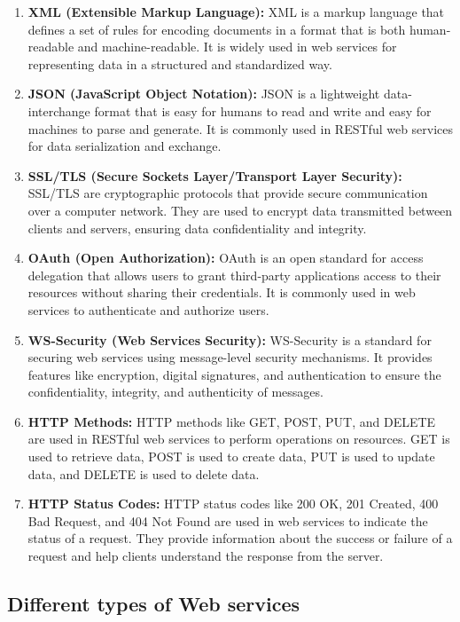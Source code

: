 \documentclass[11pt]{article}
\begin{document}
\begin{enumerate}
    \item \textbf{XML (Extensible Markup Language):} XML is a markup language that defines a set of rules for encoding documents in a format that is both human-readable and machine-readable. It is widely used in web services for representing data in a structured and standardized way.
    \item \textbf{JSON (JavaScript Object Notation):} JSON is a lightweight data-interchange format that is easy for humans to read and write and easy for machines to parse and generate. It is commonly used in RESTful web services for data serialization and exchange.
    \item \textbf{SSL/TLS (Secure Sockets Layer/Transport Layer Security):} SSL/TLS are cryptographic protocols that provide secure communication over a computer network. They are used to encrypt data transmitted between clients and servers, ensuring data confidentiality and integrity.
    \item \textbf{OAuth (Open Authorization):} OAuth is an open standard for access delegation that allows users to grant third-party applications access to their resources without sharing their credentials. It is commonly used in web services to authenticate and authorize users.
    \item \textbf{WS-Security (Web Services Security):} WS-Security is a standard for securing web services using message-level security mechanisms. It provides features like encryption, digital signatures, and authentication to ensure the confidentiality, integrity, and authenticity of messages.
    \item \textbf{HTTP Methods:} HTTP methods like GET, POST, PUT, and DELETE are used in RESTful web services to perform operations on resources. GET is used to retrieve data, POST is used to create data, PUT is used to update data, and DELETE is used to delete data.
    \item \textbf{HTTP Status Codes:} HTTP status codes like 200 OK, 201 Created, 400 Bad Request, and 404 Not Found are used in web services to indicate the status of a request. They provide information about the success or failure of a request and help clients understand the response from the server.
\end{enumerate}

\subsection{Different types of Web services}
\end{document}
